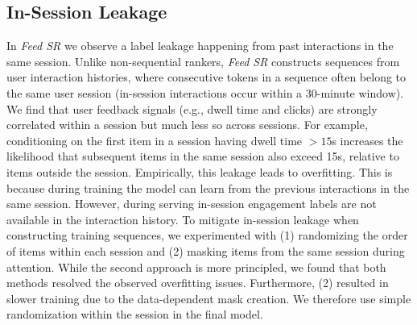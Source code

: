\documentclass[sigconf]{acmart}
\newcommand{\systemname}{\textit{Feed SR}}
\begin{document}
\subsection{In-Session Leakage}\label{sec:in-session-leakage}
In {\systemname} we observe a label leakage happening from past interactions in the same session. Unlike non-sequential rankers, {\systemname} constructs sequences from user interaction histories, where consecutive tokens in a sequence often belong to the same user session (in-session interactions occur within a 30-minute window). We find that user feedback signals (e.g., dwell time and clicks) are strongly correlated within a session but much less so across sessions. For example, conditioning on the first item in a session having dwell time $>15$s increases the likelihood that subsequent items in the same session also exceed 15s, relative to items outside the session. Empirically, this leakage leads to overfitting. This is because during training the model can learn from the previous interactions in the same session. However, during serving in-session engagement labels are not available in the interaction history. To mitigate in-session leakage when constructing training sequences, we experimented with (1) randomizing the order of items within each session and (2) masking items from the same session during attention. While the second approach is more principled, we found that both methods resolved the observed overfitting issues. Furthermore, (2) resulted in slower training due to the data-dependent mask creation. We therefore use simple randomization within the session in the final model.
\end{document}
